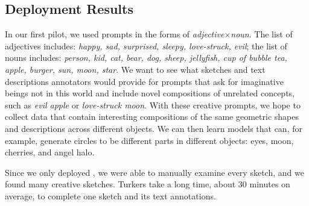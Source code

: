 
\subsection{Deployment Results}
In our first pilot, we used prompts in the forms of \textit{adjective}$\times$\textit{noun}. 
The list of adjectives includes: \textit{happy, sad, surprised, sleepy, love-struck, evil}; the list of nouns includes: 
\textit{person, kid, cat, bear, dog, sheep, jellyfish, cup of bubble tea, apple, burger, sun, moon, star}. 
We want to see what sketches and text descriptions annotators would provide for prompts that ask for imaginative beings not in this world and include novel compositions of unrelated concepts, such as \textit{evil apple} or \textit{love-struck moon}. 
With these creative prompts, we hope to collect data that contain interesting compositions of the same geometric shapes and descriptions across different objects. 
We can then learn models that can, for example, generate circles to be different parts in different objects: eyes, moon, cherries, and angel halo. 

Since we only deployed , we were able to manually examine every sketch, and we found many creative sketches. 
Turkers take a long time, about 30 minutes on average, to complete one sketch and its text annotations. 




